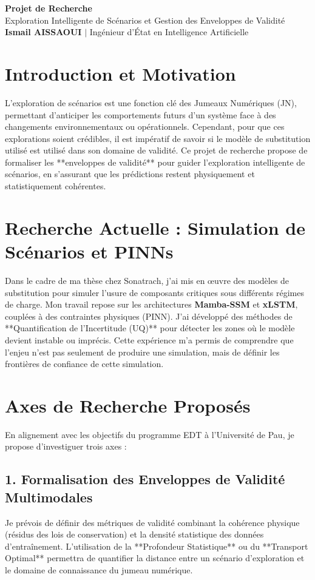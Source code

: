 \documentclass[11pt,a4paper]{article}
\begin{document}
\begin{center}
    {\LARGE\bfseries\color{titleblue} Projet de Recherche}\\[6pt]
    {\large Exploration Intelligente de Scénarios et Gestion des Enveloppes de Validité}\\[4pt]
    \textbf{Ismail AISSAOUI} $|$ Ingénieur d'État en Intelligence Artificielle
\end{center}

\bigskip

\section{Introduction et Motivation}
L'exploration de scénarios est une fonction clé des Jumeaux Numériques (JN), permettant d'anticiper les comportements futurs d'un système face à des changements environnementaux ou opérationnels. Cependant, pour que ces explorations soient crédibles, il est impératif de savoir si le modèle de substitution utilisé est utilisé dans son domaine de validité. Ce projet de recherche propose de formaliser les **enveloppes de validité** pour guider l'exploration intelligente de scénarios, en s'assurant que les prédictions restent physiquement et statistiquement cohérentes.

\section{Recherche Actuelle : Simulation de Scénarios et PINNs}
Dans le cadre de ma thèse chez Sonatrach, j'ai mis en œuvre des modèles de substitution pour simuler l'usure de composants critiques sous différents régimes de charge. Mon travail repose sur les architectures \textbf{Mamba-SSM} et \textbf{xLSTM}, couplées à des contraintes physiques (PINN). J'ai développé des méthodes de **Quantification de l'Incertitude (UQ)** pour détecter les zones où le modèle devient instable ou imprécis. Cette expérience m'a permis de comprendre que l'enjeu n'est pas seulement de produire une simulation, mais de définir les frontières de confiance de cette simulation.

\section{Axes de Recherche Proposés}
En alignement avec les objectifs du programme EDT à l'Université de Pau, je propose d'investiguer trois axes :

\subsection{1. Formalisation des Enveloppes de Validité Multimodales}
Je prévois de définir des métriques de validité combinant la cohérence physique (résidus des lois de conservation) et la densité statistique des données d'entraînement. L'utilisation de la **Profondeur Statistique** ou du **Transport Optimal** permettra de quantifier la distance entre un scénario d'exploration et le domaine de connaissance du jumeau numérique.
\end{document}
